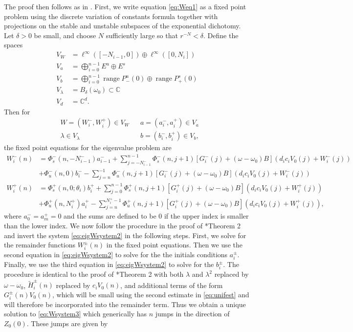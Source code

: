 \documentclass[12pt,reqno]{amsart}
\def\C{{\mathbb C}}
\DeclareMathOperator{\ran}{range}
\begin{document}
The proof then follows as in \cites{Parker2020,Sandstede1998}. First, we write equation \cref{eq:Weq1} as a fixed point problem using the discrete variation of constants formula together with projections on the stable and unstable subspaces of the exponential dichotomy. Let $\delta > 0$ be small, and choose $N$ sufficiently large so that $r^{-N} < \delta$. Define the spaces
\begin{align*}
V_W &= \ell^\infty([-N_{i-1}, 0]) \oplus \ell^\infty([0, N_i])  \\
V_a &= \bigoplus_{i=0}^{n-1} E^u \oplus E^s \\
V_b &= \bigoplus_{i=0}^{n-1} \ran P_-^u(0) \oplus \ran P_+^s(0)\\
V_\lambda &= B_\delta(\omega_0) \subset \C \\
V_d &= \C^d.
\end{align*}
Then for
\begin{align*}
&W = (W_i^-, W_i^+) \in V_W  && a = (a_i^-, a_i^+) \in V_a \\
&\lambda \in V_\lambda  &&b = (b_i^-, b_i^+) \in V_b,
\end{align*}
the fixed point equations for the eigenvalue problem are
\begin{equation*}\label{fpeig}
\begin{aligned}
W_i^-(n) &= 
\Phi_s^-(n, -N_{i-1}^-) a_{i-1}^- + \sum_{j = -N_{i-1}^-}^{n-1} \Phi_s^-(n, j+1)
[G_i^-(j) + (\omega - \omega_0) B](d_i c_i V_0(j) + W_i^-(j))
 \\
&+ \Phi_u^-(n, 0) b_i^- - \sum_{j = n}^{-1} \Phi_u^-(n, j+1) 
[G_i^-(j) + (\omega - \omega_0) B](d_i c_i V_0(j) + W_i^-(j))\\
W_i^+(n) &= \Phi_s^+(n, 0; \theta_i) b_i^+ + \sum_{j = 0}^{n-1} \Phi_s^+(n, j+1) 
[G_i^+(j) + (\omega - \omega_0) B](d_i c_i V_0(j) + W_i^+(j))\\
&+ \Phi_u^+(n, N_i^+) a_i^+ - \sum_{j = n}^{N_i^+-1} \Phi_u^+(n, j+1) 
[G_i^+(j) + (\omega - \omega_0) B](d_i c_i V_0(j) + W_i^+(j)),
\end{aligned}
\end{equation*}
where $a_0^- = a_m^+ = 0$ and the sums are defined to be $0$ if the upper index is smaller than the lower index. We now follow the procedure in the proof of \cite{Parker2020}*{Theorem 2} and invert the system \cref{eq:eigWsystem2} in the following steps. First, we solve for the remainder functions $W_i^\pm(n)$ in the fixed point equations. Then we use the second equation in \cref{eq:eigWsystem2} to solve for the  the initials conditions $a_i^\pm$. Finally, we use the third equation in \cref{eq:eigWsystem2} to solve for the $b_i^\pm$. The procedure is identical to the proof of \cite{Parker2020}*{Theorem 2} with both $\lambda$ and $\lambda^2$ replaced by $\omega - \omega_0$, $\tilde{H}_i^\pm(n)$ replaced by $c_i V_0(n)$, and additional terms of the form $G_i^\pm(n) V_0(n)$, which will be small using the second estimate in \cref{eq:unifest} and will therefore be incorporated into the remainder term. Thus we obtain a unique solution to \cref{eq:Wsystem3} which generically has $n$ jumps in the direction of $Z_0(0)$. These jumps are given by 
\end{document}
